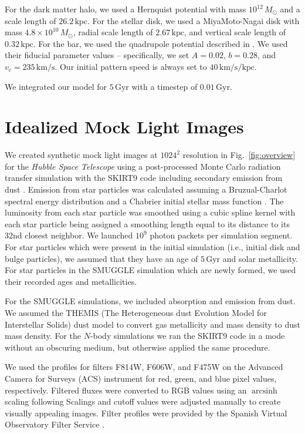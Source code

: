 \documentclass[twocolumn,linenumbers]{aastex631}
\newcommand{\kms}{\ensuremath{\textrm{km}/\textrm{s}}}
\newcommand{\Nbody}{$N$-body}
\newcommand{\SMUGGLE}{SMUGGLE}
\newcommand{\Msun}{\ensuremath{M_{\odot}}}
\DeclareMathOperator\arcsinh{arcsinh}
\begin{document}
For the dark matter halo, we used a Hernquist potential
\citep{1990ApJ...356..359H} with mass $10^{12}\,\Msun$ and a scale length of
$26.2\,\textrm{kpc}$. For the stellar disk, we used a MiyaMoto-Nagai disk
\citep{1975PASJ...27..533M} with mass $4.8\times10^{10}\,\Msun$, radial scale
length of $2.67\,\textrm{kpc}$, and vertical scale length of
$0.32\,\textrm{kpc}$. For the bar, we used the quadrupole potential described in
\citet{2022MNRAS.513..768C}. We used their fiducial parameter values --
specifically, we set $A=0.02$, $b=0.28$, and $v_c = 235\,\kms$. Our initial
pattern speed is always set to $40\,\kms/\textrm{kpc}$.

We integrated our model for $5\,\textrm{Gyr}$ with a timestep of
$0.01\,\textrm{Gyr}$.

\section{Idealized Mock Light Images}
\label{app:hst}
We created synthetic mock light images at $1024^2$ resolution in
Fig.~\ref{fig:overview} for the \textit{Hubble Space Telescope} using a
post-processed Monte Carlo radiation transfer simulation with the SKIRT9 code
including secondary emission from dust \citep{2020AC....3100381C}. Emission from
star particles was calculated assuming a Bruzual-Charlot spectral energy
distribution \citep{2003MNRAS.344.1000B} and a Chabrier initial stellar mass
function \citep{2003PASP..115..763C}. The luminosity from each star particle was
smoothed using a cubic spline kernel with each star particle being assigned a
smoothing length equal to its distance to its $32$nd closest neighbor. We
launched $10^9$ photon packets per simulation segment. For star particles
which were present in the initial simulation (i.e., initial disk and bulge
particles), we assumed that they have an age of $5\,\textrm{Gyr}$ and solar
metallicity. For star particles in the \SMUGGLE{} simulation which are newly
formed, we used their recorded ages and metallicities.

For the \SMUGGLE{} simulations, we included absorption and emission from dust. We
assumed the THEMIS (The Heterogeneous dust Evolution Model for Interstellar
Solids) dust model \citep{2017AA...602A..46J} to convert gas metallicity and
mass density to dust mass density. For the \Nbody{} simulations we ran the
SKIRT9 code in a mode without an obscuring medium, but otherwise applied the
same procedure.

We used the profiles for filters F814W, F606W, and F475W on the Advanced
Camera for Surveys (ACS) instrument for red, green, and blue pixel values,
respectively. Filtered fluxes were converted to RGB values using an $\arcsinh$
scaling following \citet{2004PASP..116..133L} Scalings and cutoff values
were adjusted manually to create visually appealing images. Filter profiles
were provided by the Spanish Virtual Observatory Filter
Service \citep{2012ivoa.rept.1015R, 2020sea..confE.182R}.
\end{document}
